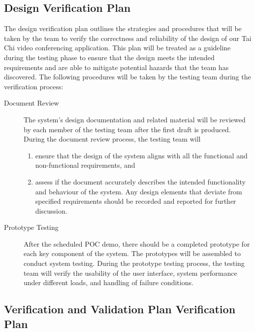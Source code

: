 \documentclass[12pt, titlepage]{article}
\begin{document}
\subsection{Design Verification Plan}

The design verification plan outlines the strategies and procedures that will be
taken by the team to verify the correctness and reliability of the design of our
Tai Chi video conferencing application. This plan will be treated as a guideline
during the testing phase to ensure that the design meets the intended
requirements and are able to mitigate potential hazards that the team has
discovered. The following procedures will be taken by the testing team during
the verification process:

\begin{description}
\item[Document Review] The system’s design documentation and related material will
  be reviewed by each member of the testing team after the first draft is
  produced. During the document review process, the testing team will
  \begin{enumerate}
  \item ensure that the design of the system aligns with all the functional and
    non-functional requirements, and
  \item assess if the document accurately describes the intended functionality and
    behaviour of the system. Any design elements that deviate from specified
    requirements should be recorded and reported for further discussion.
  \end{enumerate}
\item[Prototype Testing] After the scheduled POC demo, there should be a completed
  prototype for each key component of the system. The prototypes will be
  assembled to conduct system testing. During the prototype testing process, the
  testing team will verify the usability of the user interface, system
  performance under different loads, and handling of failure conditions.
\end{description}

\subsection{Verification and Validation Plan Verification Plan}
\end{document}
